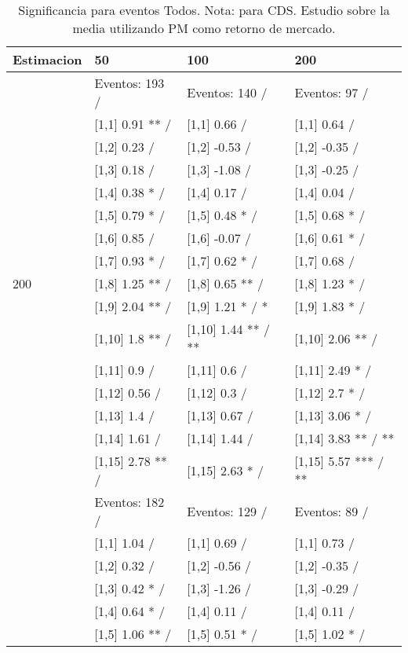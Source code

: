 \begin{table}

\caption{Significancia para eventos Todos. Nota: para CDS. Estudio sobre la media utilizando PM como retorno de mercado.}
\centering
\begin{tabular}[t]{llll}
\toprule
Estimacion & 50 & 100 & 200\\
\midrule
 & Eventos:  193 / & Eventos:  140 / & Eventos:  97 /\\
 & {}[1,1] 0.91 ** / & {}[1,1] 0.66  / & {}[1,1] 0.64  /\\
 & {}[1,2] 0.23  / & {}[1,2] -0.53  / & {}[1,2] -0.35  /\\
 & {}[1,3] 0.18  / & {}[1,3] -1.08  / & {}[1,3] -0.25  /\\
 & {}[1,4] 0.38 * / & {}[1,4] 0.17  / & {}[1,4] 0.04  /\\
\addlinespace
 & {}[1,5] 0.79 * / & {}[1,5] 0.48 * / & {}[1,5] 0.68 * /\\
 & {}[1,6] 0.85  / & {}[1,6] -0.07  / & {}[1,6] 0.61 * /\\
 & {}[1,7] 0.93 * / & {}[1,7] 0.62 * / & {}[1,7] 0.68  /\\
200 & {}[1,8] 1.25 ** / & {}[1,8] 0.65 ** / & {}[1,8] 1.23 * /\\
 & {}[1,9] 2.04 ** / & {}[1,9] 1.21 * / * & {}[1,9] 1.83 * /\\
\addlinespace
 & {}[1,10] 1.8 ** / & {}[1,10] 1.44 ** / ** & {}[1,10] 2.06 ** /\\
 & {}[1,11] 0.9  / & {}[1,11] 0.6  / & {}[1,11] 2.49 * /\\
 & {}[1,12] 0.56  / & {}[1,12] 0.3  / & {}[1,12] 2.7 * /\\
 & {}[1,13] 1.4  / & {}[1,13] 0.67  / & {}[1,13] 3.06 * /\\
 & {}[1,14] 1.61  / & {}[1,14] 1.44  / & {}[1,14] 3.83 ** / **\\
\addlinespace
 & {}[1,15] 2.78 ** / & {}[1,15] 2.63 * / & {}[1,15] 5.57 *** / **\\
 & Eventos:  182 / & Eventos:  129 / & Eventos:  89 /\\
 & {}[1,1] 1.04  / & {}[1,1] 0.69  / & {}[1,1] 0.73  /\\
 & {}[1,2] 0.32  / & {}[1,2] -0.56  / & {}[1,2] -0.35  /\\
 & {}[1,3] 0.42 * / & {}[1,3] -1.26  / & {}[1,3] -0.29  /\\
\addlinespace
 & {}[1,4] 0.64 * / & {}[1,4] 0.11  / & {}[1,4] 0.11  /\\
 & {}[1,5] 1.06 ** / & {}[1,5] 0.51 * / & {}[1,5] 1.02 * /\\

\end{tabular}
\end{table}
